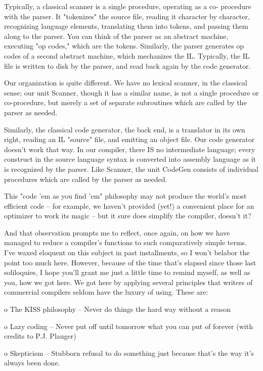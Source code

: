 \documentclass[float=false, crop=false]{standalone}
\begin{document}
Typically, a classical scanner is a single procedure, operating as a co-
procedure with the parser. It "tokenizes" the source file, reading it character
by character, recognizing language elements, translating them into tokens, and
passing them along to the parser. You can think of the parser as an abstract
machine, executing "op codes," which are the tokens. Similarly, the parser
generates op codes of a second abstract machine, which mechanizes the IL.
Typically, the IL file is written to disk by the parser, and read back again by
the code generator.

Our organization is quite different. We have no lexical scanner, in the
classical sense; our unit Scanner, though it has a similar name, is not a single
procedure or co-procedure, but merely a set of separate subroutines which are
called by the parser as needed.

Similarly, the classical code generator, the back end, is a translator in its
own right, reading an IL "source" file, and emitting an object file. Our code
generator doesn't work that way. In our compiler, there IS no intermediate
language; every construct in the source language syntax is converted into
assembly language as it is recognized by the parser. Like Scanner, the unit
CodeGen consists of individual procedures which are called by the parser as
needed.

This "code 'em as you find 'em" philosophy may not produce the world's most
efficient code -- for example, we haven't provided (yet!) a convenient place for
an optimizer to work its magic -- but it sure does simplify the compiler,
doesn't it?

And that observation prompts me to reflect, once again, on how we have managed
to reduce a compiler's functions to such comparatively simple terms. I've waxed
eloquent on this subject in past installments, so I won't belabor the point too
much here. However, because of the time that's elapsed since those last
soliloquies, I hope you'll grant me just a little time to remind myself, as well
as you, how we got here. We got here by applying several principles that writers
of commercial compilers seldom have the luxury of using. These are:

o	The KISS philosophy -- Never do things the hard way without a
reason

o	Lazy coding -- Never put off until tomorrow what you can put
of forever (with credits to P.J. Plauger)

o	Skepticism -- Stubborn refusal to do something just because
that's the way it's always been done.
\end{document}
